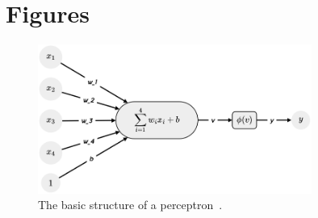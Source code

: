 \section{Figures}\label{sec:figures-perceptron}

\begin{figure}[H]
    \centering
    \includegraphics[width=0.8\textwidth]{figures/perceptron/Perceptron1c}
    \caption[Caption used in list of tables]{The basic structure of a perceptron~\cite{MaadCookbook2024}.}
    \label{fig:Perceptron1}
\end{figure}


